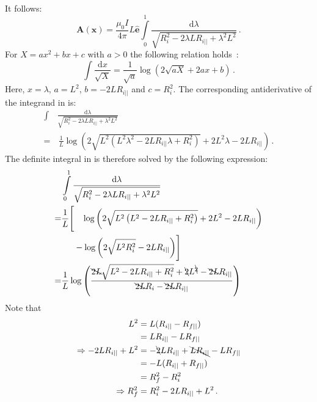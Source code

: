 It follows:
\begin{equation}
 \mathbf{A}(\mathbf{x})
 = \frac{\mu_0 I}{4 \pi} L \hat{\mathbf{e}} \int\limits_0^1 \frac{\mathrm{d}\lambda}{\sqrt{R_i^2 - 2 \lambda L R_{i ||} + \lambda^2 L^2}} \, . \label{eqn:A_integral}
\end{equation}
For $X = a x^2 + b x + c$ with $a>0$ the following relation holds~\cite{bronstein}:
\begin{equation}
 \int \frac{\mathrm{d}x}{\sqrt{X}} = \frac{1}{\sqrt{a}} \log \left( 2 \sqrt{a X} + 2 a x + b \right) \, .
\end{equation}
Here, $x = \lambda$, $a = L^2$, $b=-2 L R_{i ||}$ and $c=R_i^2$.
The corresponding antiderivative of the integrand in  is:
\begin{align}
 \int&\frac{\mathrm{d}\lambda}{\sqrt{R_i^2 - 2 \lambda L R_{i ||} + \lambda^2 L^2}} \nonumber \\
 =&\, \frac{1}{L} \log \left( 2 \sqrt{L^2\left( L^2 \lambda^2 - 2 L R_{i ||} \lambda + R_i^2 \right)} + 2 L^2 \lambda - 2 L R_{i ||} \right) \, .
\end{align}
The definite integral in  is therefore solved by the following expression:
\begin{align}
 ~ & \int\limits_0^1 \frac{\mathrm{d}\lambda}{\sqrt{R_i^2 - 2 \lambda L R_{i ||} + \lambda^2 L^2}} \\
 = & \frac{1}{L} \Biggl[\phantom{-}\, \log \left( 2 \sqrt{L^2\left( L^2 - 2 L R_{i ||} + R_i^2 \right)} + 2 L^2 - 2 L R_{i ||} \right) \nonumber \\
 ~ & \phantom{\frac{1}{L} \Biggl[} - \log \left( 2 \sqrt{L^2 R_i^2 } - 2 L R_{i ||} \right) \Biggr] \\
 = & \frac{1}{L} \log \left( \frac{ \bcancel{2 L} \sqrt{L^2 - 2 L R_{i ||} + R_i^2} + \bcancel{2} L^{\bcancel{2}} - \bcancel{2 L} R_{i ||} }{ \bcancel{2 L} R_i - \bcancel{2 L} R_{i ||} } \right)
\end{align}
Note that
\begin{align}
                             L^2 & = L (R_{i ||} - R_{f ||} ) \\
                              ~  & = L R_{i ||} - L R_{f ||} \\
\Rightarrow -2 L R_{i ||} + L^2  & = - \bcancel{2} L R_{i ||}  + \bcancel{L R_{i ||}} - L R_{f ||} \\
                              ~  & = -L (R_{i ||} + R_{f ||} ) \\
                              ~  & = R_f^2 - R_i^2 \\
\Rightarrow                R_f^2 & = R_i^2 -2 L R_{i ||} + L^2 \, .
\end{align}

